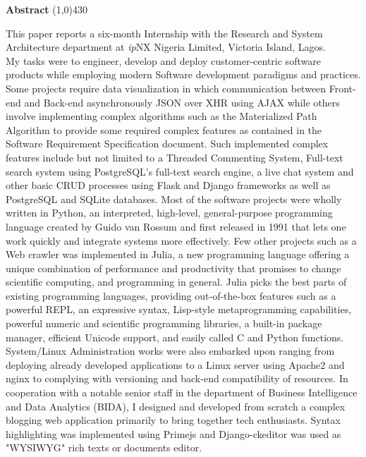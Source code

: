 \begin{center}
	{\huge \bf Abstract}
	\line(1,0){430}
\end{center}

This paper reports a six-month Internship with the Research and System Architecture department at \textit{ip}NX Nigeria Limited, Victoria Island, Lagos.\\ 

My tasks were to engineer, develop and deploy customer-centric software products while employing modern Software development paradigms and practices. Some projects require data visualization in which communication between Front-end and Back-end asynchronously \ac{JSON} over \ac{XHR} using \ac{AJAX} while others involve implementing complex algorithms such as the Materialized Path Algorithm to provide some required complex features as contained in the Software Requirement Specification document. Such implemented complex features include but not limited to a Threaded Commenting System, Full-text search system using PostgreSQL's full-text search engine, a live chat system and other basic \ac{CRUD} processes using Flask and Django frameworks as well as PostgreSQL and SQLite databases. Most of the software projects were wholly written in Python, an interpreted, high-level, general-purpose programming language created by Guido van Rossum and first released in 1991 that lets one work quickly and integrate systems more effectively. Few other projects such as a Web crawler was implemented in Julia, a new programming language offering a unique combination of performance and productivity that promises to change scientific computing, and programming in general.
Julia picks the best parts of existing programming languages, providing out-of-the-box features such as a powerful \ac{REPL}, an expressive syntax, Lisp-style metaprogramming capabilities, powerful numeric and scientific programming libraries, a built-in package manager, efficient Unicode support, and easily called C and Python functions.\\

System/Linux Administration works were also embarked upon ranging from deploying already developed applications to a Linux server using Apache2 and nginx to complying with versioning and back-end compatibility of resources. In cooperation with a notable senior staff in the department of Business Intelligence and Data Analytics (BIDA), I designed and developed from scratch a complex blogging web application  primarily to bring together tech enthusiasts.  Syntax highlighting was implemented using Primejs and Django-ckeditor was used as "\ac{WYSIWYG}" rich texts or documents editor.
\clearpage
